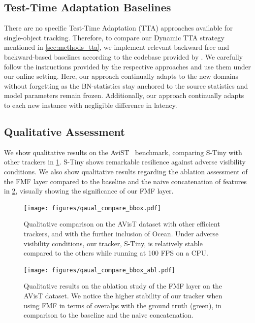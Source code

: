 \subsection{Test-Time Adaptation Baselines}
There are no specific Test-Time Adaptation (TTA) approaches available for single-object tracking. Therefore, to compare our Dynamic TTA strategy mentioned in \ref{sec:methods_tta}, we implement relevant backward-free and backward-based baselines according to the codebase provided by \cite{alfarra2023revisiting}. We carefully follow the instructions provided by the respective approaches and use them under our online setting. Here, our approach continually adapts to the new domains without forgetting as the BN-statistics stay anchored to the source statistics and model parameters remain frozen. Additionally, our approach continually adapts to each new instance with negligible difference in latency.

\subsection{Qualitative Assessment}
We show qualitative results on the AviST~\cite{noman2022avist} benchmark, comparing S-Tiny with other trackers in \ref{fig:qual_compare_bbox}. S-Tiny shows remarkable resilience against adverse visibility conditions. We also show qualitative results regarding the ablation assessment of the FMF layer compared to the baseline and the naive concatenation of features in \ref{fig:qual_compare_bbox_abl}, visually showing the significance of our FMF layer.

\begin{figure}
  \hspace*{-35pt}
    \centering
     \texttt{[image: figures/qaual\_compare\_bbox.pdf]}
     \caption{Qualitative comparison on the AVisT \cite{noman2022avist} dataset with other efficient trackers, and with the further inclusion of Ocean. Under adverse visibility conditions, our tracker, S-Tiny, is relatively stable compared to the others while running at 100 FPS on a CPU.}
     \label{fig:qual_compare_bbox}
\end{figure}

\begin{figure}
	\hspace*{-35pt}
    \centering
     \texttt{[image: figures/qaual\_compare\_bbox\_abl.pdf]}
     \caption{ Qualitative results on the ablation study of the FMF layer on the AVisT \cite{noman2022avist} dataset. We notice the higher stability of our tracker when using FMF in terms of overalps with the ground truth (green), in comparison to the baseline and the naive concatenation.}
     \label{fig:qual_compare_bbox_abl}
\end{figure}
  